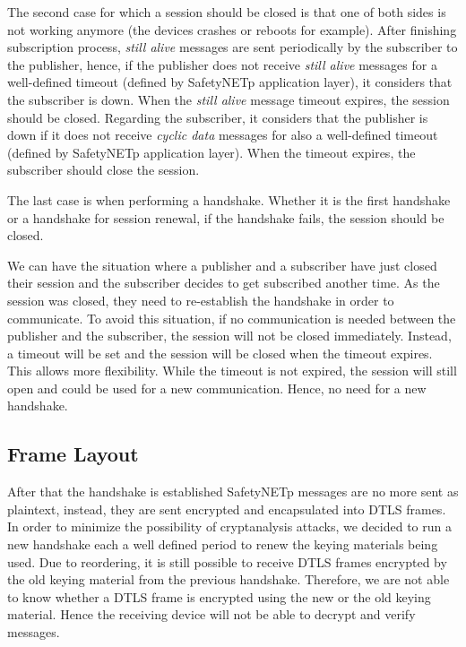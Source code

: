 The second case for which a session should be closed is that one of both sides is not working anymore (the devices crashes
or reboots for example). After finishing subscription process, \textit{still alive} messages are sent periodically by the subscriber
to the publisher, hence, if the publisher does not receive \textit{still alive} messages for a well-defined timeout (defined by SafetyNETp application layer),
it considers that the subscriber is down. When the \textit{still alive} message timeout expires, the session should be closed.
Regarding the subscriber, it considers that the publisher is down if it does not receive \textit{cyclic data} messages for also a well-defined timeout (defined by SafetyNETp application layer).
When the timeout expires, the subscriber should close the session.

The last case is when performing a handshake. Whether it is the first handshake or a handshake for session renewal,
if the handshake fails, the session should be closed.

We can have the situation where a publisher and a subscriber have just closed their session
and the subscriber decides to get subscribed another time. As the session was closed, they
need to re-establish the handshake in order to communicate. To avoid this situation, if no
communication is needed between the publisher and the subscriber, the session will not be closed
immediately. Instead, a timeout will be set and the session will be closed when the timeout expires.
This allows more flexibility. While the timeout is not expired,
the session will still open and could be used for a new communication. Hence, no need for a new handshake.

\subsection{Frame Layout}

After that the handshake is established SafetyNETp messages are no more sent as plaintext, instead, they
are sent encrypted and encapsulated into DTLS frames. In order to minimize the possibility of cryptanalysis attacks,
we decided to run a new handshake each a well defined period to renew the keying materials being used.
Due to reordering, it is still possible to receive DTLS frames encrypted by the old keying material
from the previous handshake. Therefore, we are not able to know whether a DTLS frame is encrypted
using the new or the old keying material. Hence the receiving device will not be able to decrypt
and verify messages.

